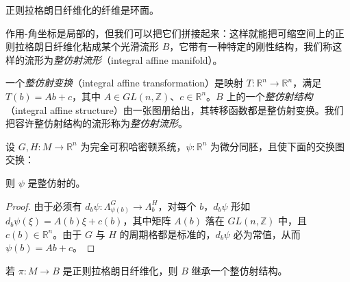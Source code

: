 \begin{corollary*}
正则拉格朗日纤维化的纤维是环面。
\end{corollary*}

作用-角坐标是局部的，但我们可以把它们拼接起来：这样就能把可缩空间上的正则拉格朗日纤维化粘成某个光滑流形 $B$，它带有一种特定的刚性结构，我们称这样的流形为\emph{整仿射流形}（integral affine manifold）。

\begin{definition*}
一个\emph{整仿射变换}（integral affine transformation）是映射 $T\colon\mathbb{R}^n\to\mathbb{R}^n$，满足 $T(b)=Ab+c$，其中 $A\in GL(n,\mathbb{Z})$、$c\in\mathbb{R}^n$。$B$ 上的一个\emph{整仿射结构}（integral affine structure）由一张图册给出，其转移函数都是整仿射变换。我们把容许整仿射结构的流形称为\emph{整仿射流形}。
\end{definition*}


\begin{lemma*}
设 $G,H\colon M\to\mathbb{R}^n$ 为完全可积哈密顿系统，$\psi\colon\mathbb{R}^n$ 为微分同胚，且使下面的交换图交换：


则 $\psi$ 是整仿射的。
\end{lemma*}


\begin{proof}
由于必须有 $d_b\psi\colon\Lambda_{\psi (b)}^G\to\Lambda_b^H$，对每个 $b$，$d_b\psi$ 形如 $d_b\psi (\xi)=A(b)\xi +c(b)$，其中矩阵 $A(b)$ 落在 $GL(n,\mathbb{Z})$ 中，且 $c(b)\in\mathbb{R}^n$。由于 $G$ 与 $H$ 的周期格都是标准的，$d_b\psi$ 必为常值，从而 $\psi (b)=Ab+c$。
\end{proof}


\begin{corollary*}
若 $\pi\colon M\to B$ 是正则拉格朗日纤维化，则 $B$ 继承一个整仿射结构。
\end{corollary*}

